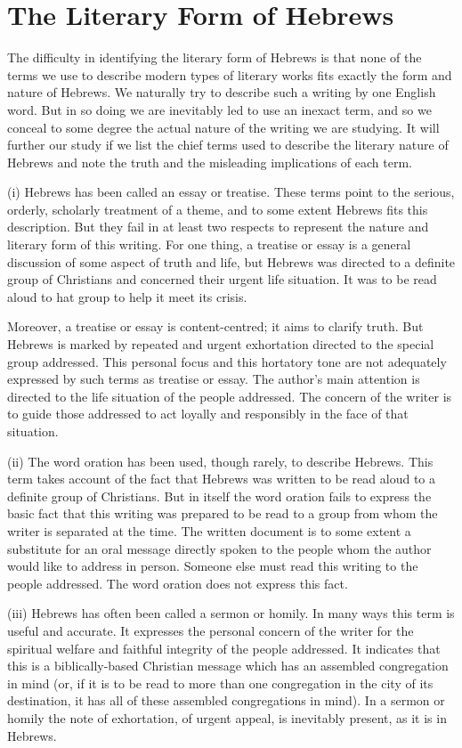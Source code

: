 \section{The Literary Form of Hebrews}
The difficulty in identifying the literary form of Hebrews is that none of the
terms we use to describe modern types of literary works fits exactly the form
and nature of Hebrews.
We naturally try to describe such a writing by one English word.
But in so doing we are inevitably led to use an inexact term, and so we conceal
to some degree the actual nature of the writing we are studying.
It will further our study if we list the chief terms used to describe the
literary nature of Hebrews and note the truth and the misleading implications of
each term.

(i) Hebrews has been called an essay or treatise.
These terms point to the serious, orderly, scholarly treatment of a theme, and
to some extent Hebrews fits this description.
But they fail in at least two respects to represent the nature and literary form
of this writing.
For one thing, a treatise or essay is a general discussion of some aspect of
truth and life, but  Hebrews was directed to a definite group of Christians and
concerned their urgent life situation.
It was to be read aloud to hat group to help it meet its crisis.

Moreover, a treatise or essay is content-centred; it aims to clarify truth.
But Hebrews is marked by repeated and urgent exhortation directed to the special
group addressed.
This personal focus and this hortatory tone are not adequately expressed by such
terms as treatise or essay.
The author's main attention is directed to the life situation of the people
addressed.
The concern of the writer is to guide those addressed to act loyally and
responsibly in the face of that situation.

(ii) The word oration has been used, though rarely, to describe Hebrews.
This term takes account of the fact that Hebrews was written to be read aloud to
a definite group of Christians.
But in itself the word oration fails to express the basic fact that this writing
was prepared to be read to a group from whom the writer is separated at the
time.
The written document is to some extent a substitute for an oral message directly
spoken to the people whom the author would like to address in person.
Someone else must read this writing to the people addressed.
The word oration does not express this fact.

(iii) Hebrews has often been called a sermon or homily.
In many ways this term is useful and accurate.
It expresses the personal concern of the writer for the spiritual welfare and
faithful integrity of the people addressed.
It indicates that this is a biblically-based Christian message which has an
assembled congregation in mind (or, if it is to be read to more than one
congregation in the city of its destination, it has all of these assembled
congregations in mind).
In a sermon or homily the note of exhortation, of urgent appeal, is inevitably
present, as it is in Hebrews.

